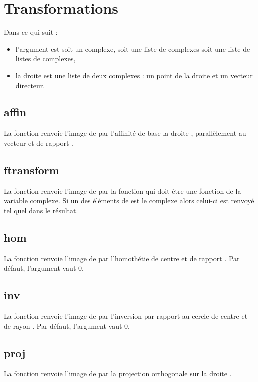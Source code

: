 \section{Transformations}
Dans ce qui suit :
\begin{itemize}
    \item l'argument  est soit un complexe, soit une liste de complexes soit une liste de listes de complexes,
    \item la droite  est une liste de deux complexes : un point de la droite et un vecteur directeur.
  \end{itemize}
  
\subsection{affin}
La fonction  renvoie l'image de  par l'affinité de base la droite , parallèlement au vecteur  et de rapport .

\subsection{ftransform}
La fonction  renvoie l'image de  par la fonction  qui doit être une fonction de la variable complexe. Si un des éléments de  est le complexe  alors celui-ci est renvoyé tel quel dans le résultat.

\subsection{hom}
La fonction  renvoie l'image de  par l'homothétie de centre  et de rapport . Par défaut, l'argument  vaut $0$.

\subsection{inv}
La fonction  renvoie l'image de  par l'inversion par rapport au cercle de centre  et de rayon . Par défaut, l'argument  vaut $0$.

\subsection{proj}
La fonction  renvoie l'image de  par la projection orthogonale sur la droite .


